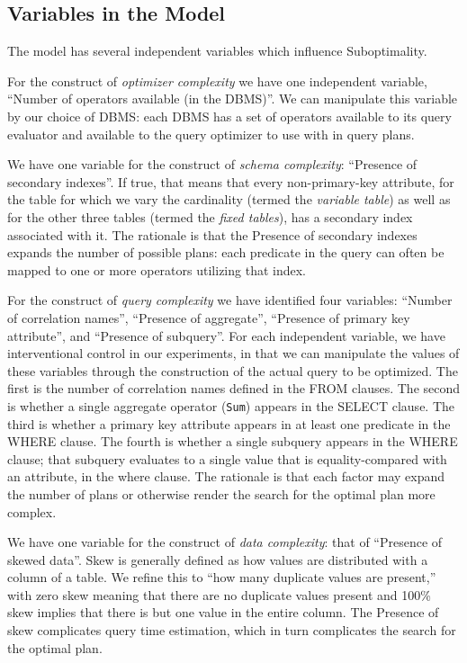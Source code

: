 \documentclass[prodmode,acmtods]{acmsmall}
\begin{document}
\subsection{Variables in the Model}
The model has several independent
variables which influence Suboptimality.

For the construct of {\em optimizer
complexity} we have one independent variable, ``\hbox{Number} of operators
available (in the \hbox{DBMS})''. We can manipulate this variable by our choice of
\hbox{DBMS}: each \hbox{DBMS} has a set of operators available to its query
evaluator and available to the query optimizer to use with in query plans.

We have one variable for the construct of {\em schema complexity}:
``Presence of secondary indexes''. If true, that means that every
non-primary-key attribute, for the table for which we vary the cardinality
(termed the {\em variable table}) as well as for the other three tables
(termed the {\em fixed
tables}), has a secondary index associated with it. The rationale is that the
Presence of secondary indexes expands the number of possible plans: each
predicate in the query can often be mapped to one or more operators
utilizing that index.

For the construct of {\em query complexity} we have identified four
variables: ``Number of correlation names'', ``Presence of aggregate'',
``Presence of primary key attribute'', and ``Presence of subquery''. For each independent
variable, we have interventional control in our experiments, in that we can
manipulate the values of these variables through the construction of the
actual query to be optimized. The first is the number of correlation names
defined in the FROM clauses. The second is whether a single aggregate operator
({\tt Sum}) appears in the SELECT clause. The third
is whether a primary key attribute appears in at least one predicate in the
WHERE clause. The fourth is whether a single subquery appears in the
WHERE clause; that subquery evaluates to a single value that is
equality-compared with an attribute, in the where clause. The rationale is
that each factor may expand the number of plans or otherwise render the search for
the optimal plan more complex.

We have one variable for the construct of {\em data complexity}: that of
``Presence of skewed data''.  Skew is generally defined as how values are
distributed with a column of a table. We refine this to ``how many duplicate
values are present,'' with zero skew meaning that there are no duplicate
values present and 100\% skew implies that there is but one value in the
entire column. The Presence of skew complicates query time estimation, which
in turn complicates the search for the optimal plan.
\end{document}
